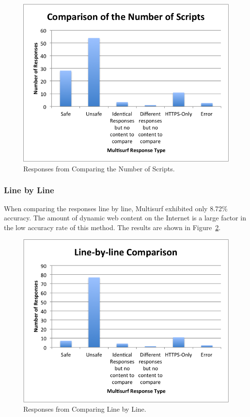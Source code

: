 \begin{figure}[htb]
\label{fig:scripts}
\begin{center}
\includegraphics[width=\linewidth]{scripts}
\caption{Responses from Comparing the Number of Scripts.}
\end{center}
\end{figure}

\subsubsection{Line by Line}
When comparing the responses line by line, Multisurf exhibited only 8.72\% accuracy.  The amount of dynamic web content on the Internet is a large factor in the low accuracy rate of this method.  The results are shown in Figure~\ref{fig:lines}.

\begin{figure}[htb]
\label{fig:lines}
\begin{center}
\includegraphics[width=\linewidth]{lines}
\caption{Responses from Comparing Line by Line.}
\end{center}
\end{figure}

